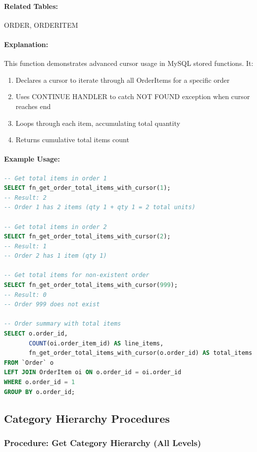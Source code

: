 \paragraph{Related Tables:} ORDER, ORDERITEM

\paragraph{Explanation:}
This function demonstrates advanced cursor usage in MySQL stored functions. It:
\begin{enumerate}
    \item Declares a cursor to iterate through all OrderItems for a specific order
    \item Uses CONTINUE HANDLER to catch NOT FOUND exception when cursor reaches end
    \item Loops through each item, accumulating total quantity
    \item Returns cumulative total items count
\end{enumerate}

\paragraph{Example Usage:}

\begin{lstlisting}[language=SQL]
-- Get total items in order 1
SELECT fn_get_order_total_items_with_cursor(1);
-- Result: 2
-- Order 1 has 2 items (qty 1 + qty 1 = 2 total units)

-- Get total items in order 2
SELECT fn_get_order_total_items_with_cursor(2);
-- Result: 1
-- Order 2 has 1 item (qty 1)

-- Get total items for non-existent order
SELECT fn_get_order_total_items_with_cursor(999);
-- Result: 0
-- Order 999 does not exist

-- Order summary with total items
SELECT o.order_id, 
       COUNT(oi.order_item_id) AS line_items,
       fn_get_order_total_items_with_cursor(o.order_id) AS total_items
FROM `Order` o
LEFT JOIN OrderItem oi ON o.order_id = oi.order_id
WHERE o.order_id = 1
GROUP BY o.order_id;
\end{lstlisting}

\subsection{Category Hierarchy Procedures}

\subsubsection{Procedure: Get Category Hierarchy (All Levels)}


